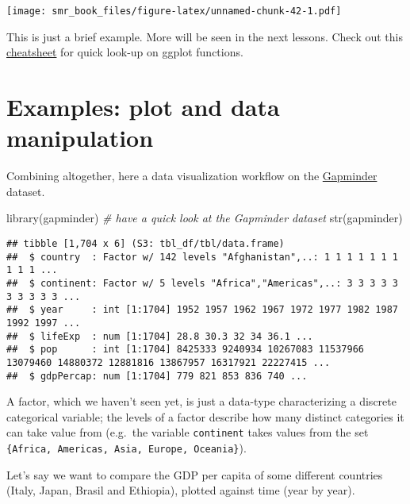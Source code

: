 \documentclass[
  oneside]{book}
\newenvironment{Shaded}{\begin{snugshade}}{\end{snugshade}}
\newcommand{\CommentTok}[1]{\textcolor[rgb]{0.56,0.35,0.01}{\textit{#1}}}
\newcommand{\FunctionTok}[1]{\textcolor[rgb]{0.00,0.00,0.00}{#1}}
\newcommand{\NormalTok}[1]{#1}
\begin{document}
\texttt{[image: smr\_book\_files/figure-latex/unnamed-chunk-42-1.pdf]}

This is just a brief example. More will be seen in the next lessons.
Check out this
\href{https://github.com/rstudio/cheatsheets/blob/main/data-visualization.pdf}{cheatsheet}
for quick look-up on ggplot functions.

\hypertarget{examples-plot-and-data-manipulation}{%
\section{Examples: plot and data manipulation}\label{examples-plot-and-data-manipulation}}

Combining altogether, here a data visualization workflow on the
\href{https://www.gapminder.org/data/}{Gapminder} dataset.

\begin{Shaded}
\begin{Highlighting}[]
\FunctionTok{library}\NormalTok{(gapminder)}
\CommentTok{\# have a quick look at the Gapminder dataset}
\FunctionTok{str}\NormalTok{(gapminder)}
\end{Highlighting}
\end{Shaded}

\begin{verbatim}
## tibble [1,704 x 6] (S3: tbl_df/tbl/data.frame)
##  $ country  : Factor w/ 142 levels "Afghanistan",..: 1 1 1 1 1 1 1 1 1 1 ...
##  $ continent: Factor w/ 5 levels "Africa","Americas",..: 3 3 3 3 3 3 3 3 3 3 ...
##  $ year     : int [1:1704] 1952 1957 1962 1967 1972 1977 1982 1987 1992 1997 ...
##  $ lifeExp  : num [1:1704] 28.8 30.3 32 34 36.1 ...
##  $ pop      : int [1:1704] 8425333 9240934 10267083 11537966 13079460 14880372 12881816 13867957 16317921 22227415 ...
##  $ gdpPercap: num [1:1704] 779 821 853 836 740 ...
\end{verbatim}

A factor, which we haven't seen yet, is just a data-type characterizing a
discrete categorical variable; the levels of a factor describe how many
distinct categories it can take value from (e.g.~the variable \texttt{continent} takes
values from the set \texttt{\{Africa,\ Americas,\ Asia,\ Europe,\ Oceania\}}).

Let's say we want to compare the GDP per capita of some
different countries (Italy, Japan, Brasil and Ethiopia),
plotted against time (year by year).
\end{document}
